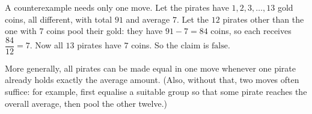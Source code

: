 A counterexample needs only one move. Let the pirates have $1,2,3,\dots,13$ gold coins, all different, with total $91$ and average $7$. Let the $12$ pirates other than the one with $7$ coins pool their gold: they have $91-7=84$ coins, so each receives $\dfrac{84}{12}=7$. Now all $13$ pirates have $7$ coins. So the claim is $\boxed{\text{false}}$.

More generally, all pirates can be made equal in one move whenever one pirate already holds exactly the average amount. (Also, without that, two moves often suffice: for example, first equalise a suitable group so that some pirate reaches the overall average, then pool the other twelve.)
